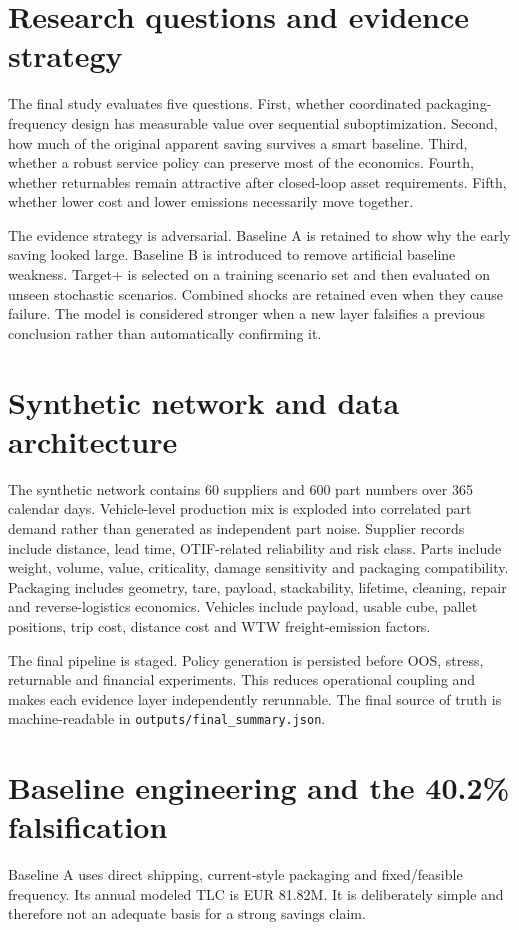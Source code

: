 \documentclass[11pt]{article}
\begin{document}
\section{Research questions and evidence strategy}
The final study evaluates five questions. First, whether coordinated packaging-frequency design has measurable value over sequential suboptimization. Second, how much of the original apparent saving survives a smart baseline. Third, whether a robust service policy can preserve most of the economics. Fourth, whether returnables remain attractive after closed-loop asset requirements. Fifth, whether lower cost and lower emissions necessarily move together.

The evidence strategy is adversarial. Baseline A is retained to show why the early saving looked large. Baseline B is introduced to remove artificial baseline weakness. Target+ is selected on a training scenario set and then evaluated on unseen stochastic scenarios. Combined shocks are retained even when they cause failure. The model is considered stronger when a new layer falsifies a previous conclusion rather than automatically confirming it.

\section{Synthetic network and data architecture}
The synthetic network contains 60 suppliers and 600 part numbers over 365 calendar days. Vehicle-level production mix is exploded into correlated part demand rather than generated as independent part noise. Supplier records include distance, lead time, OTIF-related reliability and risk class. Parts include weight, volume, value, criticality, damage sensitivity and packaging compatibility. Packaging includes geometry, tare, payload, stackability, lifetime, cleaning, repair and reverse-logistics economics. Vehicles include payload, usable cube, pallet positions, trip cost, distance cost and WTW freight-emission factors.

The final pipeline is staged. Policy generation is persisted before OOS, stress, returnable and financial experiments. This reduces operational coupling and makes each evidence layer independently rerunnable. The final source of truth is machine-readable in \texttt{outputs/final\_summary.json}.

\section{Baseline engineering and the 40.2\% falsification}
Baseline A uses direct shipping, current-style packaging and fixed/feasible frequency. Its annual modeled TLC is EUR 81.82M. It is deliberately simple and therefore not an adequate basis for a strong savings claim.
\end{document}
